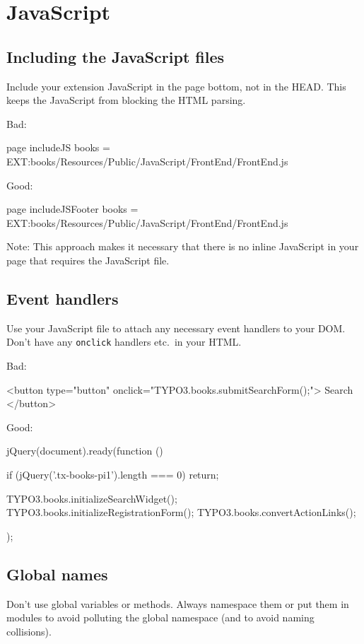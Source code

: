 \chapter{JavaScript}
\label{javascript}

\section{Including the JavaScript files}

Include your extension JavaScript in the page bottom, not in the HEAD. This keeps the JavaScript from blocking the HTML parsing.

Bad:

\begin{textcode}
page {
  includeJS {
    books = EXT:books/Resources/Public/JavaScript/FrontEnd/FrontEnd.js
  }
}
\end{textcode}

Good:

\begin{textcode}
page {
  includeJSFooter {
    books = EXT:books/Resources/Public/JavaScript/FrontEnd/FrontEnd.js
  }
}
\end{textcode}

Note: This approach makes it necessary that there is no inline JavaScript in your page that requires the JavaScript file.


\section{Event handlers}
Use your JavaScript file to attach any necessary event handlers to your DOM. Don't have any \texttt{onclick} handlers etc.~in your HTML.

Bad:

\begin{htmlcode}
<button type="button" onclick="TYPO3.books.submitSearchForm();">
  Search
</button>
\end{htmlcode}

Good:

\begin{jscode}
jQuery(document).ready(function () {
    if (jQuery('.tx-books-pi1').length === 0) {
        return;
    }

    TYPO3.books.initializeSearchWidget();
    TYPO3.books.initializeRegistrationForm();
    TYPO3.books.convertActionLinks();
});
\end{jscode}


\section{Global names}

Don’t use global variables or methods. Always namespace them or put them in modules to avoid polluting the global namespace (and to avoid naming collisions).
